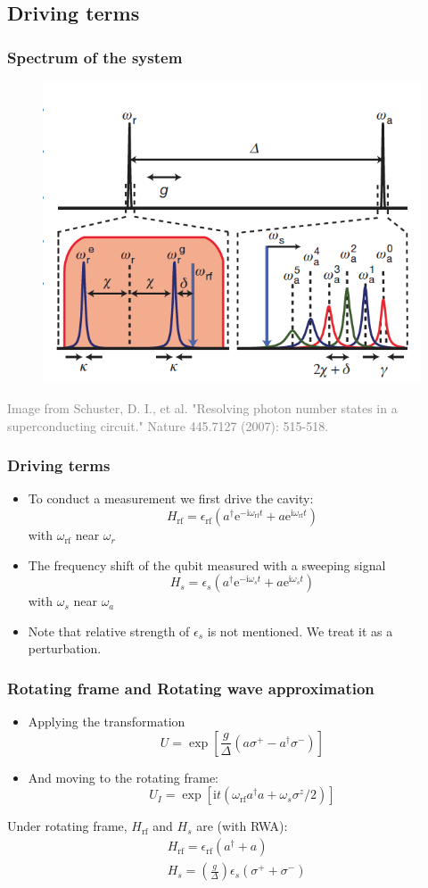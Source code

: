 \documentclass[xcolor=dvipsnames,hyperref={CJKbookmarks=true},aspectratio=169]{beamer}
\newcommand\mi{\mathrm{i}}
\newcommand\e{\mathrm{e}}
\newcommand{\rf}{\text{rf}}
\begin{document}
\subsection{Driving terms}
\begin{frame}\frametitle{Spectrum of the system}
\begin{figure}
\centering
\includegraphics[width=0.55\linewidth]{TransitionLines}
\end{figure}
\tiny{\textcolor{gray}{Image from Schuster, D. I., et al. "Resolving photon number states in a superconducting circuit." Nature 445.7127 (2007): 515-518.\cite{schuster2007resolving}}}
\end{frame}

\begin{frame}
\frametitle{Driving terms}
\begin{itemize}
\item To conduct a measurement we first drive the cavity:
    $$
      H_{\rf} = \epsilon_{\rf}\left(a^{\dagger}\e^{-\mi\omega_{\rf}t}
      +a\e^{\mi\omega_{\rf}t} \right)
    $$
with $\omega_{\rf}$ near $\omega_r$
\item The frequency shift of the qubit measured with a sweeping signal
    $$
      H_{s} = \epsilon_{s}\left(a^{\dagger}\e^{-\mi\omega_{s}t}
      +a\e^{\mi\omega_{s}t} \right)
    $$
with $\omega_{s}$ near $\omega_a$
\item Note that relative strength of $\epsilon_s$ is not mentioned. We treat it 
as a perturbation. 
\end{itemize}
\end{frame}

\begin{frame}
\frametitle{Rotating frame and Rotating wave approximation}
\begin{itemize}
\item Applying the transformation
$$U=\exp\left[\dfrac{g}{\Delta}\left(a\sigma^{+}-a^{\dagger}\sigma^{-} \right)\right]$$
\item And moving to the rotating frame:
$$U_I=\exp\left[\mi t\left(
\omega_{\rf}a^{\dagger}a +\omega_s\sigma^{z}/2 \right)\right]$$
\end{itemize}
Under rotating frame, $H_{\rf}$ and $H_{s}$ are (with RWA):
\begin{align*}
	&H_{\rf} = \epsilon_{\rf}\left(a^{\dagger}+a\right) \\
	&H_{s} = \left(\frac{g}{\Delta}\right)\epsilon_{s}\left(\sigma^{+}+\sigma^{-} \right)
\end{align*}
\end{frame}
\end{document}
